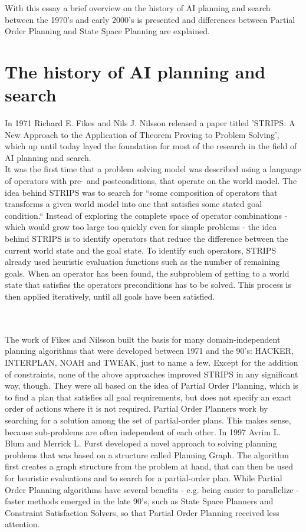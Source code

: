 \documentclass{article}
\begin{document}
With this essay a brief overview on the history of AI planning and search between the
1970's and early 2000's is presented and differences between Partial Order Planning
and State Space Planning are explained.

\section*{The history of AI planning and search}
In 1971 Richard E. Fikes and Nils J. Nilsson released a paper titled 'STRIPS: A New
Approach to the Application of Theorem Proving to Problem Solving', which up until
today layed the foundation for most of the research in the field of AI planning
and search.\\
It was the first time that a problem solving model was described using a language
of operators with pre- and postconditions, that operate on the world model. The
idea behind STRIPS was to search for ``some composition of operators that transforms a
given world model into one that satisfies some stated goal condition.`` \cite{STRIPS}
Instead of exploring the complete space of operator combinations - which would grow
too large too quickly even for simple problems - the idea behind STRIPS is to identify
operators that reduce the difference between the current world state and the goal state.
To identify such operators, STRIPS already used heuristic evaluation functions such
as the number of remaining goals.
When an operator has been found, the subproblem of getting to a world state that
satisfies the operators preconditions has to be solved. This process is then applied
iteratively, until all goals have been satisfied.

\\\\

The work of Fikes and Nilsson built the basis for many domain-independent planning
algorithms that were developed between 1971 and the 90's: HACKER, INTERPLAN, NOAH
and TWEAK, just to name a few. \cite{chapman87}
Except for the addition of constraints, none of the above approaches improved STRIPS in any significant
way, though. \cite{chapman87} They were all based on the idea of Partial Order Planning, which
is to find a plan that satisfies all goal requirements, but does not specify an
exact order of actions where it is not required. Partial Order Planners work by searching
for a solution among the set of partial-order plans. This makes sense, because sub-problems
are often independent of each other.
In 1997 Avrim L. Blum and Merrick L. Furst developed a novel approach to solving planning problems
that was based on a structure called Planning Graph. \cite{blum97} The algorithm first
creates a graph structure from the problem at hand, that can then be used for heuristic evaluations
and to search for a partial-order plan.
While Partial Order Planning algorithms have several benefits - e.g. being easier to parallelize - faster methods
emerged in the late 90's, such as State Space Planners and Constraint Satisfaction Solvers,
so that Partial Order Planning received less attention. \cite{AIMA}
\end{document}
